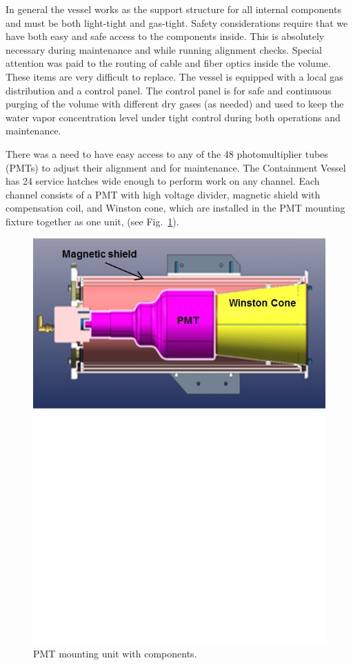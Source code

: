 In general the vessel works as the support structure for all internal components and must be both light-tight and
gas-tight. Safety considerations require that we have both easy and safe access to the components inside. This is
absolutely necessary during maintenance and while running alignment checks. Special attention was paid to the
routing of cable and fiber optics inside the volume. These items are very difficult to replace. The vessel is
equipped with a local gas distribution and a control panel. The control panel is for safe and continuous purging
of the volume with different dry gases (as needed) and used to keep the water vapor concentration level under
tight control during both operations and maintenance.

There was a need to have easy access to any of the 48 photomultiplier tubes (PMTs) to adjust their alignment
and for maintenance. The Containment Vessel has 24 service hatches wide enough to perform work on any channel.
Each channel consists of a PMT with high voltage divider, magnetic shield with compensation coil, and Winston
cone, which are installed in the PMT mounting fixture together as one unit, (see Fig.~\ref{fig:PMT_Mount}).

\begin{figure}[ht]
    \centering
    \includegraphics[width=1.0\linewidth,trim={0 12cm 0 0},clip]{images/PMT_Mount.jpg}
    \caption{PMT mounting unit with components.}
    \label{fig:PMT_Mount}
\end{figure}

